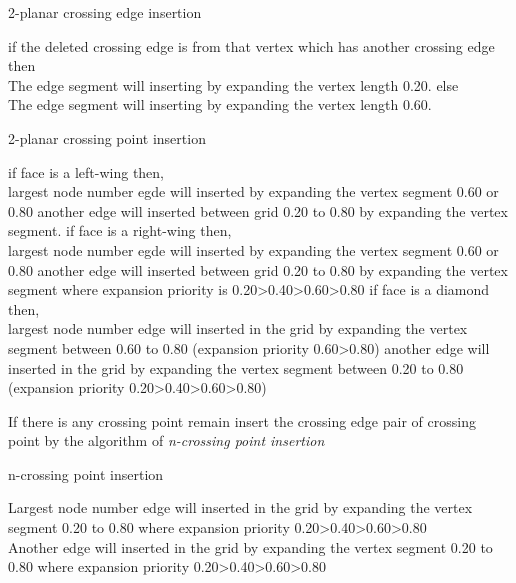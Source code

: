 \begin{algorithm}
\caption{2-planar crossing edge insertion}
\label{2pcei}
\begin{algorithmic}[1]

\STATE if the deleted crossing edge is from that vertex which has another crossing edge then\\
The edge segment will inserting by expanding the vertex length 0.20.
\STATE else \\
The edge segment will inserting by expanding the vertex length 0.60.

\end{algorithmic}
\end{algorithm}


\begin{algorithm}
\caption{2-planar crossing point insertion}
\label{2pcpi}
\begin{algorithmic}[1]

\STATE if face is a left-wing then,\\

largest node number  egde will inserted by expanding the vertex segment  0.60 or 0.80
another edge will inserted between grid 0.20 to 0.80  by expanding the vertex segment.
\STATE if face is a right-wing then,\\

largest node number egde will inserted by expanding the vertex segment  0.60 or 0.80
another edge will inserted between grid 0.20 to 0.80 by expanding the vertex segment where expansion priority is 0.20\textgreater 0.40\textgreater 0.60\textgreater 0.80
\STATE if face is a diamond then,\\
largest node number edge will inserted in the grid by expanding the vertex segment between 0.60 to 0.80 (expansion priority 0.60\textgreater 0.80)
another edge will inserted in the grid by expanding the vertex segment between 0.20 to 0.80  (expansion priority 0.20\textgreater 0.40\textgreater 0.60\textgreater 0.80)

\STATE If there is any crossing point remain insert the crossing edge pair of crossing point by the algorithm of \emph{n-crossing point insertion}

\end{algorithmic}
\end{algorithm}



\begin{algorithm}
\caption{n-crossing point insertion}
\label{ncpi}
\begin{algorithmic}[1]

\STATE Largest node number edge will inserted in the grid by expanding the vertex segment 0.20 to 0.80  where  expansion priority 0.20\textgreater 0.40\textgreater 0.60\textgreater 0.80
\\
\STATE Another edge will inserted in the grid by expanding the vertex segment 0.20 to 0.80  where  expansion priority 0.20\textgreater 0.40\textgreater 0.60\textgreater 0.80
\end{algorithmic}
\end{algorithm}



